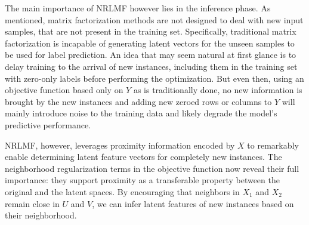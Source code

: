 \algNRLMFTrain

The main importance of NRLMF however lies in the inference phase. As mentioned, matrix factorization methods are not designed to deal with new input samples, that are not present in the training set. Specifically, traditional matrix factorization is incapable of generating latent vectors for the unseen samples to be used for label prediction. An idea that may seem natural at first glance is to delay training to the arrival of new instances, including them in the training set with zero-only labels before performing the optimization. But even then, using an objective function based only on $Y$ as is traditionally done, no new information is brought by the new instances and adding new zeroed rows or columns to $Y$ will mainly introduce noise to the training data and likely degrade the model's predictive performance.

NRLMF, however, leverages proximity information encoded by $X$ to remarkably enable determining latent feature vectors for completely new instances. The neighborhood regularization terms in the objective function now reveal their full importance: they support proximity as a transferable property between the original and the latent spaces. By encouraging that neighbors in $X_1$ and $X_2$ remain close in $U$ and $V$, we can infer latent features of new instances based on their neighborhood.

